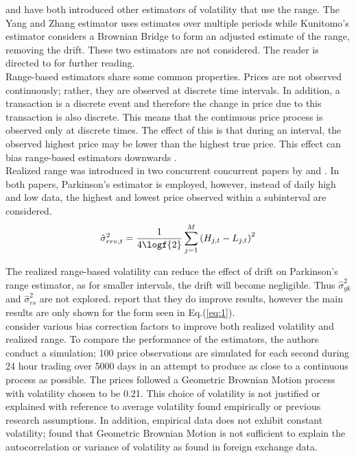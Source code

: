 \documentclass[12pt]{article}
\begin{document}
\citet{DennisYang2000} and \citet{Kunitomo1992} have both introduced other estimators of volatility that use
the range. The Yang and Zhang estimator uses estimates over multiple periods while Kunitomo's estimator
considers a Brownian Bridge to form an adjusted estimate of the range, removing the drift. These two
estimators are not considered. The reader is directed to \citet{Molnar2012} for further reading. \\

Range-based estimators share some common properties. Prices are not observed continuously; rather, they are
observed at discrete time intervals. In addition, a transaction is a discrete event and therefore the change
in price due to this transaction is also discrete. This means that the continuous price process is observed
only at discrete times. The effect of this is that during an interval, the observed highest price may be lower
than the highest true price. This effect can bias range-based estimators downwards \citep{Jacob2008}. \\

Realized range was introduced in two concurrent concurrent papers by \citet{Martens2007} and
\citet{Christensen2007}. In both papers, Parkinson's estimator is employed, however, instead of daily high and
low data, the highest and lowest price observed within a subinterval are considered. \\
\begin{align}
  \hat{\sigma}_{rrv,t}^2 = \frac{1}{4 \logf{2}} \sum_{j=1}^M \left(H_{j,t} - L_{j,t} \right)^2 \label{eq:1}
\end{align}

The realized range-based volatility can reduce the effect of drift on Parkinson's range estimator, as for
smaller intervals, the drift will become negligible. Thus $\hat{\sigma}_{gk}^2$ and $\hat{\sigma}_{rs}^2$ are
not explored. \citet{Martens2007} report that they do improve results, however the main results are only shown
for the form seen in Eq.(\ref{eq:1}). \\

\citet{Martens2007} consider various bias correction factors to improve both realized volatility and realized
range. To compare the performance of the estimators, the authors conduct a simulation; 100 price observations
are simulated for each second during 24 hour trading over 5000 days \citep{Martens2007} in an attempt to
produce as close to a continuous process as possible. The prices followed a Geometric Brownian Motion process
with volatility chosen to be 0.21. This choice of volatility is not justified or explained with reference to
average volatility found empirically or previous research assumptions. In addition, empirical data does not
exhibit constant volatility; \citet{Alizadeh2002} found that Geometric Brownian Motion is not sufficient to
explain the autocorrelation or variance of volatility as found in foreign exchange data. \\
\end{document}
